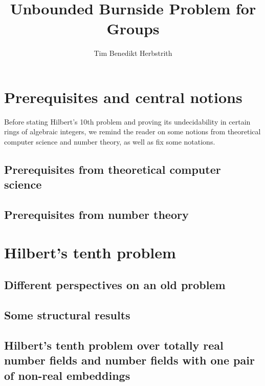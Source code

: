 \documentclass[10pt,a4paper]{scrbook}
\author{Tim Benedikt Herbstrith}
\title{Unbounded Burnside Problem for Groups}
\numberwithin{equation}{section}
\begin{document}

\allowdisplaybreaks

\frontmatter



\mainmatter

\chapter{Prerequisites and central notions}

Before stating Hilbert's 10th problem and proving its undecidability in
certain rings of algebraic integers, we remind the reader on some
notions from theoretical computer science and number theory, as well as
fix some notations.

\section{Prerequisites from theoretical computer science}


\section{Prerequisites from number theory}


\chapter{Hilbert's tenth problem}

\section{Different perspectives on an old problem}


\section{Some structural results}


\section[H10 in totally real number fields or one pair of conjugate embeddings]{Hilbert's tenth problem over totally real number fields and number fields with one pair of non-real embeddings}

\end{document}
